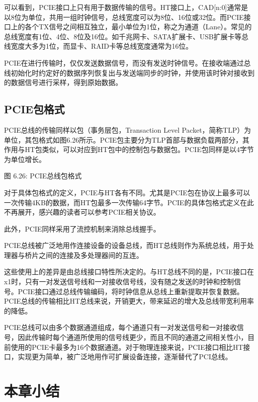 \documentclass[]{ctexbook}
\begin{document}
可以看到，PCIE接口上只有用于数据传输的信号。HT接口上，CAD{[}n:0{]}通常是以8位为单位，共用一组时钟信号，总线宽度可以为8位、16位或32位。而PCIE接口上的各个TX信号之间相互独立，最小单位为1位，称之为通道（Lane）。常见的总线宽度有1位、4位、8位及16位。如千兆网卡、SATA扩展卡、USB扩展卡等总线宽度大多为1位，而显卡、RAID卡等总线宽度通常为16位。

PCIE在进行传输时，仅仅发送数据信号，而没有发送时钟信号。在接收端通过总线初始化时约定好的数据序列恢复出与发送端同步的时钟，并使用该时钟对接收到的数据信号进行采样，得到原始数据。

\hypertarget{pcieux5305ux683cux5f0f}{%
\subsection{PCIE包格式}\label{pcieux5305ux683cux5f0f}}

PCIE总线的传输同样以包（事务层包，Transaction Level Packet，简称TLP）为单位，其包格式如图6.26所示。PCIE包主要分为TLP首部与数据负载两部分，其作用与HT包类似，可以对应到HT包中的控制包与数据包。PCIE包同样是以4字节为单位增长。

图 6.26: PCIE总线包格式

对于具体包格式的定义，PCIE与HT各有不同。尤其是PCIE包在协议上最多可以一次传输4KB的数据，而HT包最多一次传输64字节。PCIE的具体包格式定义在此不再展开，感兴趣的读者可以参考PCIE相关协议。

此外，PCIE同样采用了流控机制来消除总线握手。

PCIE总线被广泛地用作连接设备的设备总线，而HT总线则作为系统总线，用于处理器与桥片之间的连接及多处理器间的互连。

这些使用上的差异是由总线接口特性所决定的。与HT总线不同的是，PCIE接口在x1时，只有一对发送信号线和一对接收信号线，没有随之发送的时钟和控制信号。PCIE接口通过总线传输编码，将时钟信息从总线上重新提取并恢复数据。PCIE总线的传输相比HT总线来说，开销更大，带来延迟的增大及总线带宽利用率的降低。

PCIE总线可以由多个数据通道组成，每个通道只有一对发送信号和一对接收信号，因此传输时每个通道所使用的信号线更少，而且不同的通道之间相关性小，目前使用的PCIE卡最多为16个数据通道。对于物理连接来说，PCIE接口相比HT接口，实现更为简单，被广泛地用作可扩展设备连接，逐渐替代了PCI总线。

\hypertarget{ux672cux7ae0ux5c0fux7ed3-5}{%
\section{本章小结}\label{ux672cux7ae0ux5c0fux7ed3-5}}
\end{document}
